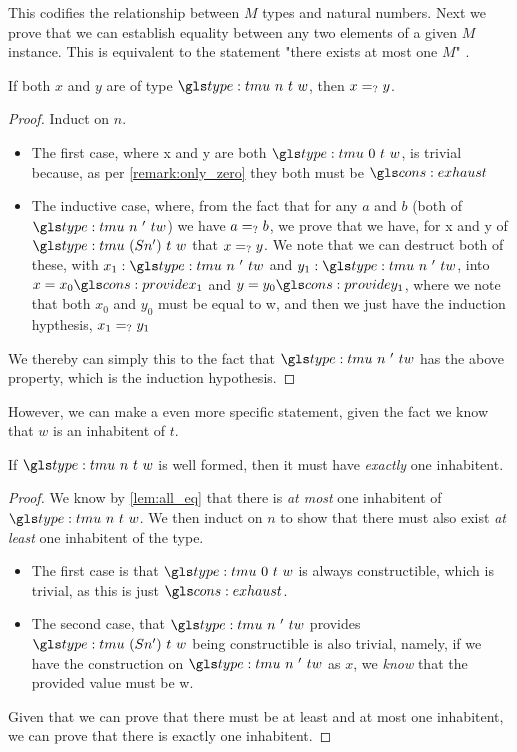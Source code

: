This codifies the relationship between $M$ types and natural numbers.
Next we prove that we can establish equality between any two elements of a given $M$ instance.
This is equivalent to the statement "there exists at most one $M$" \needcite.

\begin{lemma}
	\label{lem:all_eq}
	If both $x$ and $y$ are of type $\tm n t w$, then $x =_? y$.
\end{lemma}
\begin{proof}
	Induct on $n$.
	\begin{itemize}
		\item The first case, where \sigil x and \sigil y are both $\tm 0 t w$, is trivial because, as per \ref{remark:only_zero} they both must be $\mz$
		\item The inductive case, where, from the fact that for any $a$ and $b$ (both of $\tm n' t w$) we have $a =_? b$, we prove that we have, for \sigil x and \sigil y of $\tm {(S n')} t w$ that $x =_? y$.
		We note that we can destruct both of these, with $x_1 : \tm n' t w$ and $y_1 : \tm n' t w$, into $x = x_0 \ms x_1$ and $y = y_0 \ms y_1$, where we note that both $x_0$ and $y_0$ must be equal to \sigil w, and then we just have the induction hypthesis, $x_1 =_? y_1$
	\end{itemize}
	
	We thereby can simply this to the fact that $\tm n' t w$ has the above property, which is the induction hypothesis.
\end{proof}


However, we can make a even more specific statement, given the fact we know that $w$ is an inhabitent of $t$.
\begin{theorem}[Uniqueness]
	\label{thm:unique}
	If $\tm n t w$ is well formed, then it must have \emph{exactly} one inhabitent.
\end{theorem}
\begin{proof}
	We know by \ref{lem:all_eq} that there is \emph{at most} one inhabitent of $\tm n t w$. 
	We then induct on $n$ to show that there must also exist \emph{at least} one inhabitent of the type.
	\begin{itemize}
		\item The first case is that $\tm 0 t w$ is always constructible, which is trivial, as this is just $\mz$.
		\item The second case, that $\tm n' t w$ provides $\tm {(S n')} t w$ being constructible is also trivial, namely, if we have the construction on $\tm n' t w$ as $x$, we \emph{know} that the provided value must be \sigil w.
	\end{itemize}
	
	Given that we can prove that there must be at least and at most one inhabitent, we can prove that there is exactly one inhabitent.
\end{proof}

